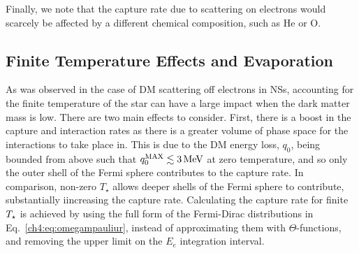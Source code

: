 Finally, we note that the capture rate due to scattering on electrons would scarcely be affected by a different chemical composition, such as He or O.




\subsection{Finite Temperature Effects and Evaporation}
\label{ch4:subsec:evapelectrons}



As was observed in the case of DM scattering off electrons in NSs, accounting for the finite temperature of the star can have a large impact when the dark matter mass is low. There are two main effects to consider. First, there is a boost in the capture and interaction rates as there is a greater volume of phase space for the interactions to take place in. 
This is due to the DM energy loss, $q_0$, being bounded from above such that $q_0^{\rm MAX}\lesssim3{\rm \,MeV}$ at zero temperature, and so only the outer shell of the Fermi sphere contributes to the capture rate. 
In comparison, non-zero $T_\star$ allows deeper shells of the Fermi sphere to contribute, substantially iincreasing the capture rate. 
Calculating the capture rate for finite $T_\star$ is achieved by using the full form of the  Fermi-Dirac distributions in Eq.~\ref{ch4:eq:omegampauliur}, instead of approximating them with $\Theta$-functions, and removing the upper limit on the $E_e$ integration interval. 


